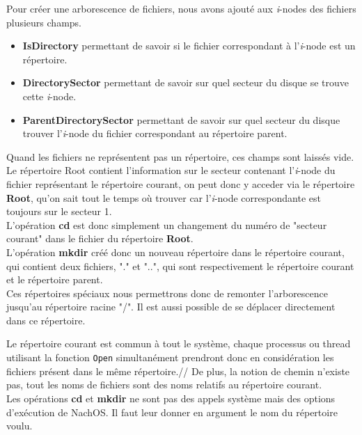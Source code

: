 \documentclass{report}
\begin{document}
Pour créer une arborescence de fichiers, nous avons ajouté aux \textit{i}-nodes des fichiers plusieurs champs.
\begin{itemize}
\item \textbf{IsDirectory} permettant de savoir si le fichier correspondant à l'\textit{i}-node est un répertoire.
\item \textbf{DirectorySector} permettant de savoir sur quel secteur du disque se trouve cette \textit{i}-node.
\item \textbf{ParentDirectorySector} permettant de savoir sur quel secteur du disque trouver l'\textit{i}-node du fichier correspondant au répertoire parent.
\end{itemize}
Quand les fichiers ne représentent pas un répertoire, ces champs sont laissés vide. \\
Le répertoire Root contient l'information sur le secteur contenant l'\textit{i}-node du fichier représentant le répertoire courant, on peut donc y acceder via le répertoire \textbf{Root}, qu'on sait tout le temps où trouver car l'\textit{i}-node correspondante est toujours sur le secteur 1.	\\	
L'opération \textbf{cd} est donc simplement un changement du numéro de "secteur courant" dans le fichier du répertoire \textbf{Root}.  \\
L'opération \textbf{mkdir} créé donc un nouveau répertoire dans le répertoire courant, qui contient deux fichiers, "." et "..", qui sont respectivement le répertoire courant et le répertoire parent.\\	
	
	Ces répertoires spéciaux nous permettrons donc de remonter l'arborescence jusqu'au répertoire racine "/". Il est aussi possible de se déplacer directement dans ce répertoire.
	
	Le répertoire courant est commun à tout le système, chaque processus ou thread utilisant la fonction \texttt{Open} simultanément prendront donc en considération les fichiers présent dans le même répertoire.//
De plus, la notion de chemin n'existe pas, tout les noms de fichiers sont des noms relatifs au répertoire courant.\\

Les opérations \textbf{cd} et \textbf{mkdir} ne sont pas des appels système mais des options d'exécution de NachOS. Il faut leur donner en argument le nom du répertoire voulu.\\
\end{document}
